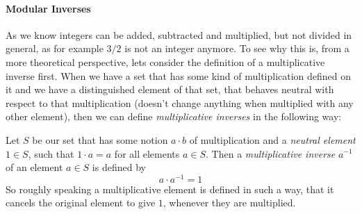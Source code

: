 \paragraph{Modular Inverses} As we know integers can be added, subtracted and multiplied, but not divided in general, as for example $3/2$ is not an integer anymore. To see why this is, from a more theoretical perspective, lets consider the definition of a multiplicative inverse first. When we have a set that has some kind of multiplication defined on it and we have a distinguished element of that set, that behaves neutral with respect to that multiplication (doesn't change anything when multiplied with any other element), then we can define \textit{multiplicative inverses} in the following way:

Let $S$ be our set that has some notion $a\cdot b$ of multiplication and a \textit{neutral element} $1\in S$, such that $1\cdot a = a$ for all elements $a\in S$. Then a \textit{multiplicative inverse} $a^{-1}$ of an element $a\in S$ is defined by
\begin{equation}
a\cdot a^{-1} = 1
\end{equation}
So roughly speaking a multiplicative element is defined in such a way, that it cancels the original element to give $1$, whenever they are multiplied. 

